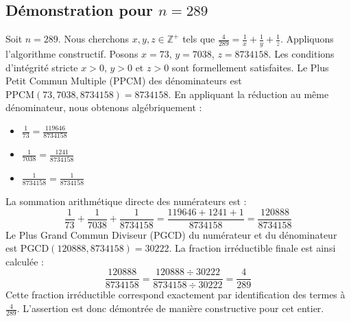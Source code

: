 \documentclass[11pt,a4paper]{article}
\begin{document}
\subsection{Démonstration pour $n = 289$}
Soit $n = 289$. Nous cherchons $x, y, z \in \mathbb{Z}^{+}$ tels que $\frac{4}{289} = \frac{1}{x} + \frac{1}{y} + \frac{1}{z}$.
Appliquons l'algorithme constructif. Posons $x = 73$, $y = 7038$, $z = 8734158$.
Les conditions d'intégrité stricte $x > 0$, $y > 0$ et $z > 0$ sont formellement satisfaites.
Le Plus Petit Commun Multiple (PPCM) des dénominateurs est $\text{PPCM}(73, 7038, 8734158) = 8734158$.
En appliquant la réduction au même dénominateur, nous obtenons algébriquement :
\begin{itemize}
    \item $\frac{1}{73} = \frac{119646}{8734158}$
    \item $\frac{1}{7038} = \frac{1241}{8734158}$
    \item $\frac{1}{8734158} = \frac{1}{8734158}$
\end{itemize}
La sommation arithmétique directe des numérateurs est :
$$ \frac{1}{73} + \frac{1}{7038} + \frac{1}{8734158} = \frac{119646 + 1241 + 1}{8734158} = \frac{120888}{8734158} $$
Le Plus Grand Commun Diviseur (PGCD) du numérateur et du dénominateur est $\text{PGCD}(120888, 8734158) = 30222$.
La fraction irréductible finale est ainsi calculée :
$$ \frac{120888}{8734158} = \frac{120888 \div 30222}{8734158 \div 30222} = \frac{4}{289} $$
Cette fraction irréductible correspond exactement par identification des termes à $\frac{4}{289}$. L'assertion est donc démontrée de manière constructive pour cet entier.
\end{document}
